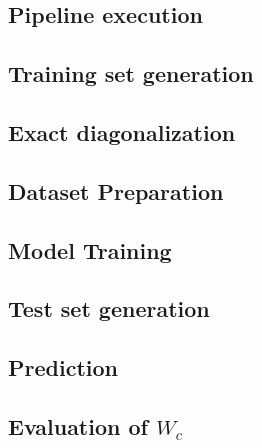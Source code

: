 \documentclass[reprint,amsmath,amssymb,aps,prb]{revtex4-2}
\begin{document}
\begin{widetext}
\subsection{Pipeline execution}


\subsection{Training set generation}


\subsection{Exact diagonalization}


\subsection{Dataset Preparation}


\subsection{Model Training}


\subsection{Test set generation}


\subsection{Prediction}


\subsection{Evaluation of $W_c$}




%
\end{widetext}
\end{document}
